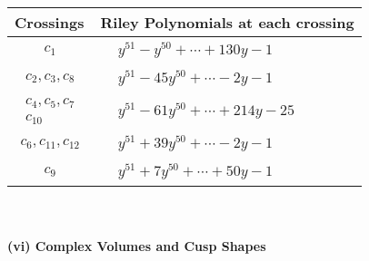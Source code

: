 \documentclass[1p]{elsarticle_modified}
\theoremstyle{definition}
\begin{document}
\begin{tabular}{m{50pt}|m{274pt}}
Crossings & \hspace{64pt}Riley Polynomials at each crossing \\
\hline $$\begin{aligned}c_{1}\end{aligned}$$&$\begin{aligned}
&y^{51}- y^{50}+\cdots+130 y-1
\end{aligned}$\\
\hline $$\begin{aligned}c_{2},c_{3},c_{8}\end{aligned}$$&$\begin{aligned}
&y^{51}-45 y^{50}+\cdots-2 y-1
\end{aligned}$\\
\hline $$\begin{aligned}c_{4},c_{5},c_{7}\\c_{10}\end{aligned}$$&$\begin{aligned}
&y^{51}-61 y^{50}+\cdots+214 y-25
\end{aligned}$\\
\hline $$\begin{aligned}c_{6},c_{11},c_{12}\end{aligned}$$&$\begin{aligned}
&y^{51}+39 y^{50}+\cdots-2 y-1
\end{aligned}$\\
\hline $$\begin{aligned}c_{9}\end{aligned}$$&$\begin{aligned}
&y^{51}+7 y^{50}+\cdots+50 y-1
\end{aligned}$\\
\hline
\end{tabular}\\~\\
\newpage\flushleft \textbf{(vi) Complex Volumes and Cusp Shapes}
\end{document}
